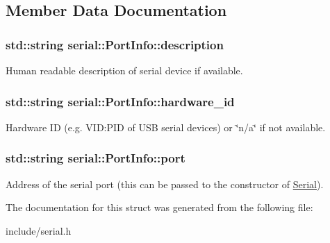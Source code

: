 \subsection{Member Data Documentation}
\subsubsection[{\texorpdfstring{description}{description}}]{\setlength{\rightskip}{0pt plus 5cm}std\+::string serial\+::\+Port\+Info\+::description}\hypertarget{structserial_1_1_port_info_a2ba37dd33d47b554aef5c15c1fe8b872}{}\label{structserial_1_1_port_info_a2ba37dd33d47b554aef5c15c1fe8b872}
Human readable description of serial device if available. 
\subsubsection[{\texorpdfstring{hardware\+\_\+id}{hardware_id}}]{\setlength{\rightskip}{0pt plus 5cm}std\+::string serial\+::\+Port\+Info\+::hardware\+\_\+id}\hypertarget{structserial_1_1_port_info_a7d55368e1a4e6ccc9da6f4d339524837}{}\label{structserial_1_1_port_info_a7d55368e1a4e6ccc9da6f4d339524837}
Hardware ID (e.\+g. V\+ID\+:P\+ID of U\+SB serial devices) or \char`\"{}n/a\char`\"{} if not available. 
\subsubsection[{\texorpdfstring{port}{port}}]{\setlength{\rightskip}{0pt plus 5cm}std\+::string serial\+::\+Port\+Info\+::port}\hypertarget{structserial_1_1_port_info_a5d4242cdd6c0d01260e24964af4c23d2}{}\label{structserial_1_1_port_info_a5d4242cdd6c0d01260e24964af4c23d2}
Address of the serial port (this can be passed to the constructor of \hyperlink{classserial_1_1_serial}{Serial}). 

The documentation for this struct was generated from the following file\+:\begin{DoxyCompactItemize}
\item 
include/serial.\+h\end{DoxyCompactItemize}
